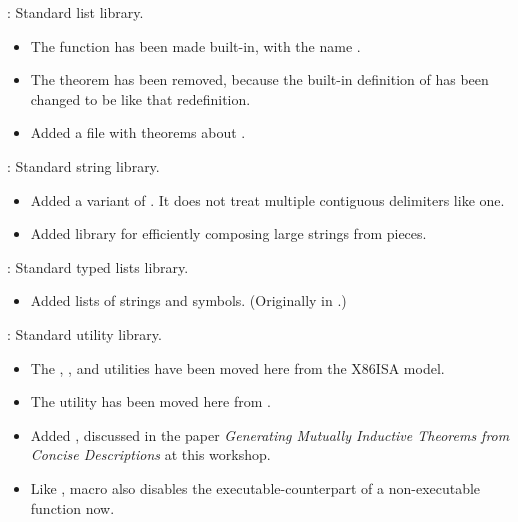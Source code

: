 \begin{frame}

\implibtitle

:
Standard list library.
\begin{itemize}
\item
The function  has been made built-in,
with the name .
\item
The  theorem has been removed,
because the built-in definition of  has been
changed to be like that redefinition.
\item
Added a file with theorems about .
\end{itemize}

\separation

:
Standard string library.
\begin{itemize}
\item
Added a variant  of .
It does not treat multiple contiguous delimiters like one.
\item
Added  library for efficiently composing large strings from pieces.
\end{itemize}

\end{frame}


\begin{frame}

\implibtitle

:
Standard typed lists library.
\begin{itemize}
\item
Added lists of strings and symbols.
(Originally in .)
\end{itemize}

\separation

:
Standard utility library.
\begin{itemize}
\item
The
,
, and
utilities have been moved here from the X86ISA model.
\item
The  utility has been moved here
from .
\item Added , discussed in the paper \textit{Generating Mutually Inductive Theorems from Concise Descriptions} at this workshop.
\item
Like ,  macro also disables the executable-counterpart of a non-executable function now.
\end{itemize}

\end{frame}

